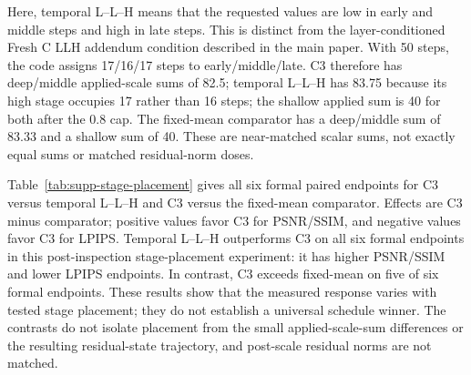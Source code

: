 \documentclass[11pt]{article}
\begin{document}
Here, temporal L--L--H means that the requested values are low in early and middle steps and high in late steps. This is distinct from the layer-conditioned Fresh C LLH addendum condition described in the main paper. With 50 steps, the code assigns 17/16/17 steps to early/middle/late. C3 therefore has deep/middle applied-scale sums of 82.5; temporal L--L--H has 83.75 because its high stage occupies 17 rather than 16 steps; the shallow applied sum is 40 for both after the 0.8 cap. The fixed-mean comparator has a deep/middle sum of 83.33 and a shallow sum of 40. These are near-matched scalar sums, not exactly equal sums or matched residual-norm doses.

Table~\ref{tab:supp-stage-placement} gives all six formal paired endpoints for C3 versus temporal L--L--H and C3 versus the fixed-mean comparator. Effects are C3 minus comparator; positive values favor C3 for PSNR/SSIM, and negative values favor C3 for LPIPS. Temporal L--L--H outperforms C3 on all six formal endpoints in this post-inspection stage-placement experiment: it has higher PSNR/SSIM and lower LPIPS endpoints. In contrast, C3 exceeds fixed-mean on five of six formal endpoints. These results show that the measured response varies with tested stage placement; they do not establish a universal schedule winner. The contrasts do not isolate placement from the small applied-scale-sum differences or the resulting residual-state trajectory, and post-scale residual norms are not matched.
\end{document}
